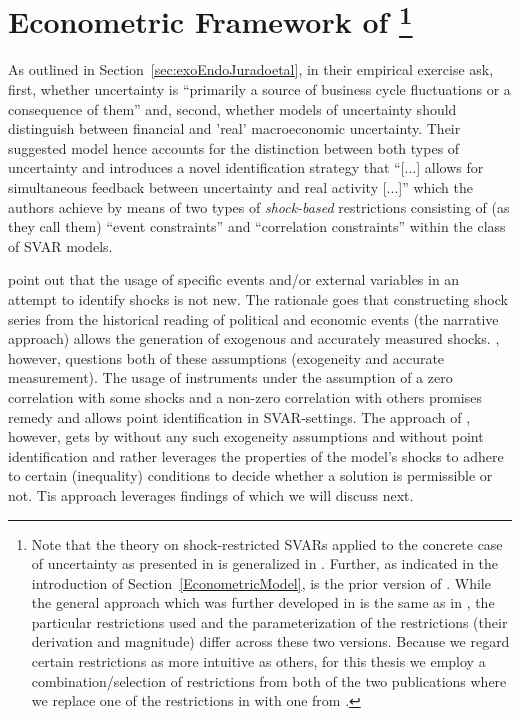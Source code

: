 \documentclass[a4paper,11pt,listof=nochaptergap,oneside,pointednumbers,bibtotoc,bigheadings,liststotoc,hidelinks]{scrbook}
\theoremstyle{mysatz}
\theoremstyle{mydefinition}
\theoremstyle{mytheorem}
\theoremstyle{mybemerkung}
\begin{document}
\section[Econometric Framework of \citep{ludvigsonetal:18,ludvigsonetal:19}]{Econometric Framework of \citep{ludvigsonetal:18,ludvigsonetal:19}\footnote{Note that the theory on shock-restricted SVARs applied to the concrete case of uncertainty as presented in \citep{ludvigsonetal:18,ludvigsonetal:19} is generalized in \citep{ludvigsonetal:17,ludvigsonetal:20a}. Further, as indicated in the introduction of Section~\ref{EconometricModel}, \citet{ludvigsonetal:18} is the prior version of \citet{ludvigsonetal:19}. While the general approach which was further developed in \citet{ludvigsonetal:19} is the same as in \citet{ludvigsonetal:18}, the particular restrictions used and the parameterization of the restrictions (their derivation and magnitude) differ across these two versions. Because we regard certain restrictions as more intuitive as others, for this thesis we employ a combination/selection of restrictions from both of the two publications where we replace one of the restrictions in \citet{ludvigsonetal:19} with one from \citet{ludvigsonetal:18}.}}
\label{sec:econometricframeworkLMN}

As outlined in Section~\ref{sec:exoEndoJuradoetal}, in their empirical exercise \citet[p. 2]{ludvigsonetal:19} ask, first, whether uncertainty is ``primarily a source of business cycle fluctuations or a consequence of them'' and, second, whether models of uncertainty should distinguish between financial and 'real' macroeconomic uncertainty. Their suggested model hence accounts for the distinction between both types of uncertainty and introduces a novel identification strategy that ``[...] allows for simultaneous feedback between uncertainty and real activity [...]'' which the authors achieve by means of two types of \textit{shock-based} restrictions consisting of (as they call them) ``event constraints'' and ``correlation constraints'' within the class of SVAR models. 

\citet{ludvigsonetal:19} point out that the usage of specific events and/or external variables in an attempt to identify shocks is not new. The rationale goes that constructing shock series from the historical reading of political and economic events (the narrative approach) allows the generation of exogenous and accurately measured shocks. \citet{ramey:16}, however, questions both of these assumptions (exogeneity and accurate measurement). The usage of instruments under the assumption of a zero correlation with some shocks and a non-zero correlation with others promises remedy and allows point identification in SVAR-settings. The approach of \citet{ludvigsonetal:19}, however, gets by without any such exogeneity assumptions and without point identification and rather leverages the properties of the model's shocks to adhere to certain (inequality) conditions to decide whether a solution is permissible or not. Tis approach leverages findings of \citet{rubioetal:10} which we will discuss next.
\end{document}
